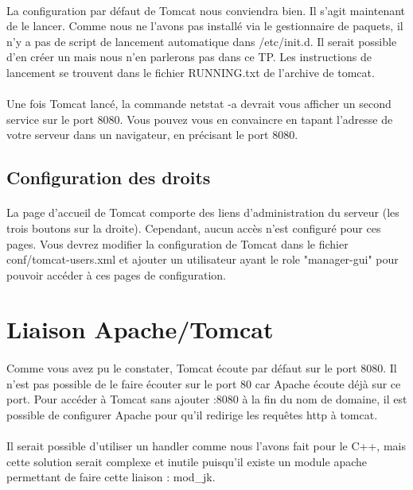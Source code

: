 \documentclass[12pt,a4paper]{article}
\begin{document}
\paragraph{}
La configuration par défaut de Tomcat nous conviendra bien. Il s'agit maintenant de le lancer. Comme nous ne l'avons pas installé via le gestionnaire de paquets, il n'y a pas de script de lancement automatique dans /etc/init.d. Il serait possible d'en créer un mais nous n'en parlerons pas dans ce TP. Les instructions de lancement se trouvent dans le fichier RUNNING.txt de l'archive de tomcat.

\paragraph{}
Une fois Tomcat lancé, la commande netstat -a devrait vous afficher un second service sur le port 8080. Vous pouvez vous en convaincre en tapant l'adresse de votre serveur dans un navigateur, en précisant le port 8080.

\subsection{Configuration des droits}
\paragraph{}
La page d'accueil de Tomcat comporte des liens d'administration du serveur (les trois boutons sur la droite). Cependant, aucun accès n'est configuré pour ces pages. Vous devrez modifier la configuration de Tomcat dans le fichier conf/tomcat-users.xml et ajouter un utilisateur ayant le role "manager-gui" pour pouvoir accéder à ces pages de configuration.

\section{Liaison Apache/Tomcat}

\paragraph{}
Comme vous avez pu le constater, Tomcat écoute par défaut sur le port 8080. Il n'est pas possible de le faire écouter sur le port 80 car Apache écoute déjà sur ce port. Pour accéder à Tomcat sans ajouter :8080 à la fin du nom de domaine, il est possible de configurer Apache pour qu'il redirige les requêtes http à tomcat.

\paragraph{}
Il serait possible d'utiliser un handler comme nous l'avons fait pour le C++, mais cette solution serait complexe et inutile puisqu'il existe un module apache permettant de faire cette liaison : mod\_jk.
\end{document}
